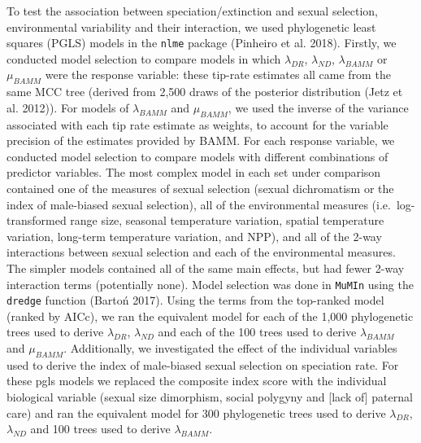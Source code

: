 \documentclass[]{article}
\begin{document}
To test the association between speciation/extinction and sexual
selection, environmental variability and their interaction, we used
phylogenetic least squares (PGLS) models in the \texttt{nlme} package
(Pinheiro et al. 2018). Firstly, we conducted model selection to compare
models in which \(\lambda_{DR}\), \(\lambda_{ND}\), \(\lambda_{BAMM}\)
or \(\mu_{BAMM}\) were the response variable: these tip-rate estimates
all came from the same MCC tree (derived from 2,500 draws of the
posterior distribution (Jetz et al. 2012)). For models of
\(\lambda_{BAMM}\) and \(\mu_{BAMM}\), we used the inverse of the
variance associated with each tip rate estimate as weights, to account
for the variable precision of the estimates provided by BAMM. For each
response variable, we conducted model selection to compare models with
different combinations of predictor variables. The most complex model in
each set under comparison contained one of the measures of sexual
selection (sexual dichromatism or the index of male-biased sexual
selection), all of the environmental measures (i.e.~log-transformed
range size, seasonal temperature variation, spatial temperature
variation, long-term temperature variation, and NPP), and all of the
2-way interactions between sexual selection and each of the
environmental measures. The simpler models contained all of the same
main effects, but had fewer 2-way interaction terms (potentially none).
Model selection was done in \texttt{MuMIn} using the \texttt{dredge}
function (Bartoń 2017). Using the terms from the top-ranked model
(ranked by AICc), we ran the equivalent model for each of the 1,000
phylogenetic trees used to derive \(\lambda_{DR}\), \(\lambda_{ND}\) and
each of the 100 trees used to derive \(\lambda_{BAMM}\) and
\(\mu_{BAMM}\). Additionally, we investigated the effect of the
individual variables used to derive the index of male-biased sexual
selection on speciation rate. For these pgls models we replaced the
composite index score with the individual biological variable (sexual
size dimorphism, social polygyny and {[}lack of{]} paternal care) and
ran the equivalent model for 300 phylogenetic trees used to derive
\(\lambda_{DR}\), \(\lambda_{ND}\) and 100 trees used to derive
\(\lambda_{BAMM}\).
\end{document}
